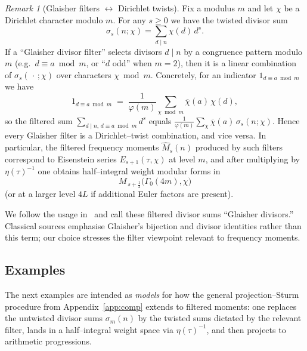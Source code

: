 \documentclass[11pt]{article}
\theoremstyle{definition}
\theoremstyle{remark}
\newtheorem{remark}[theorem]{Remark}
\begin{document}
\begin{remark}[Glaisher filters $\leftrightarrow$ Dirichlet twists]
Fix a modulus $m$ and let $\chi$ be a Dirichlet character modulo $m$.
For any $s\ge0$ we have the twisted divisor sum
\[
\sigma_s(n;\chi)=\sum_{d\mid n}\chi(d)\,d^s.
\]
If a “Glaisher divisor filter'' selects divisors $d\mid n$ by a congruence
pattern modulo $m$ (e.g.\ $d\equiv a\bmod m$, or “$d$ odd” when $m=2$),
then it is a linear combination of $\sigma_s(\,\cdot\,;\chi)$ over characters
$\chi\bmod m$. Concretely, for an indicator $1_{d\equiv a\bmod m}$ we have
\[
1_{d\equiv a\bmod m}\;=\;\frac{1}{\varphi(m)}\sum_{\chi\bmod m}
\overline{\chi}(a)\,\chi(d),
\]
so the filtered sum $\sum_{d\mid n,\,d\equiv a\bmod m}\! d^s$ equals
$\frac{1}{\varphi(m)}\sum_{\chi}\overline{\chi}(a)\,\sigma_s(n;\chi)$.
Hence every Glaisher filter is a Dirichlet–twist combination, and vice versa.
In particular, the filtered frequency moments $\widehat{M}_s(n)$ produced by
such filters correspond to Eisenstein series $E_{s+1}(\tau,\chi)$ at level $m$,
and after multiplying by $\eta(\tau)^{-1}$ one obtains half–integral weight
modular forms in
\[
M_{\,s+\tfrac12}\bigl(\Gamma_0(4m),\chi\bigr)
\]
(or at a larger level $4L$ if additional Euler factors are present).
\end{remark}

We follow the usage in~\cite{HSB-GB-Glaisher} and call these
filtered divisor sums “Glaisher divisors.” Classical sources emphasise
Glaisher’s bijection and divisor identities rather than this term; our choice
stresses the filter viewpoint relevant to frequency moments.

\subsection{Examples}

The next examples are intended as \emph{models} for how the general
projection--Sturm procedure from Appendix~\ref{app:comp} extends to filtered
moments: one replaces the untwisted divisor sums $\sigma_m(n)$ by the twisted
sums dictated by the relevant filter, lands in a half--integral weight space
via $\eta(\tau)^{-1}$, and then projects to arithmetic progressions.
\end{document}
